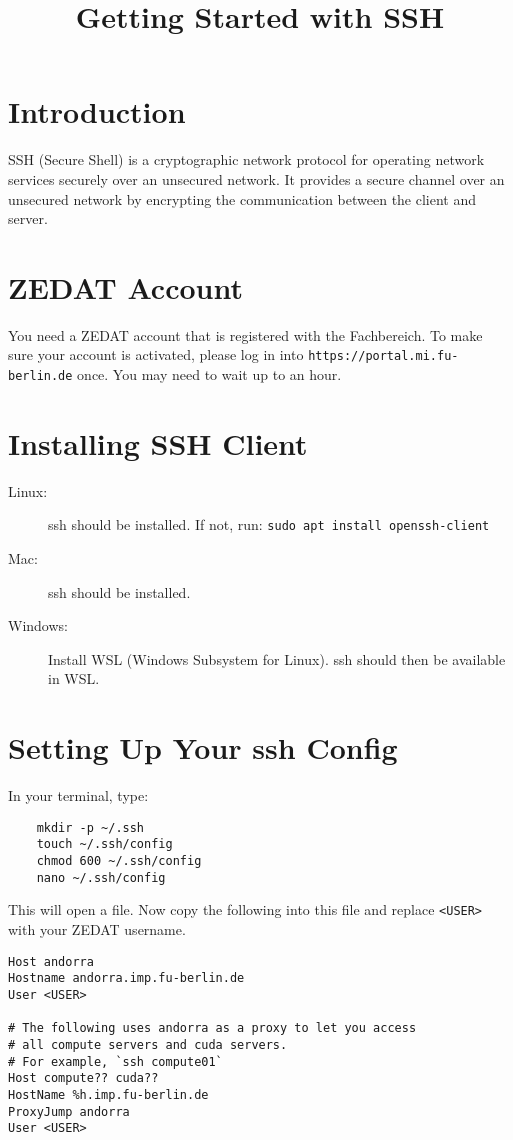 \documentclass{article}
\title{Getting Started with SSH}
\date{}
\begin{document}
\maketitle

\section{Introduction}
SSH (Secure Shell) is a cryptographic network protocol for operating network services securely over an unsecured network. It provides a secure channel over an unsecured network by encrypting the communication between the client and server.

\section{ZEDAT Account}

You need a ZEDAT account that is registered with the Fachbereich. To make sure your account is activated, please log in into \verb|https://portal.mi.fu-berlin.de| once. You may need to wait up to an hour.

\section{Installing SSH Client}

\begin{description}
    \item[Linux:] ssh should be installed. If not, run: \verb|sudo apt install openssh-client|
    \item[Mac:] ssh should be installed.
    \item[Windows:] Install WSL (Windows Subsystem for Linux). ssh should then be available in WSL.
\end{description}

\section{Setting Up Your ssh Config}

In your terminal, type:
\begin{verbatim}
    mkdir -p ~/.ssh
    touch ~/.ssh/config
    chmod 600 ~/.ssh/config
    nano ~/.ssh/config
\end{verbatim}

This will open a file. Now copy the following into this file and replace \verb|<USER>| with your ZEDAT username.

\begin{verbatim}
Host andorra
Hostname andorra.imp.fu-berlin.de
User <USER>

# The following uses andorra as a proxy to let you access
# all compute servers and cuda servers.
# For example, `ssh compute01`
Host compute?? cuda??
HostName %h.imp.fu-berlin.de
ProxyJump andorra
User <USER>
\end{verbatim}
\end{document}
